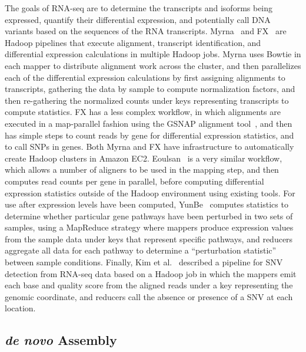 The goals of RNA-seq are to determine the transcripts and isoforms being expressed, quantify their differential expression, and potentially call DNA variants based on the sequences of the RNA transcripts.  Myrna~\cite{Langmead:2010p1268} and FX~\cite{Hong:2012du} are Hadoop pipelines that execute alignment, transcript identification, and differential expression calculations in multiple Hadoop jobs. Myrna uses Bowtie in each mapper to distribute alignment work across the cluster, and then parallelizes each of the differential expression calculations by first assigning alignments to transcripts, gathering the data by sample to compute normalization factors, and then re-gathering the normalized counts under keys representing transcripts to compute statistics. FX has a less complex workflow, in which alignments are executed in a map-parallel fashion using the GSNAP alignment tool~\cite{Wu:2010p875}, and then has simple steps to count reads by gene for differential expression statistics, and to call SNPs in genes. Both Myrna and FX have infrastructure to automatically create Hadoop clusters in Amazon EC2. Eoulsan~\cite{Jourdren:2012dc} is a very similar workflow, which allows a number of aligners to be used in the mapping step, and then computes read counts per gene in parallel, before computing differential expression statistics outside of the Hadoop environment using existing tools. For use after expression levels have been computed, YunBe~\cite{Zhang:2011p1823} computes statistics to determine whether particular gene pathways have been perturbed in two sets of samples, using a MapReduce strategy where mappers produce expression values from the sample data under keys that represent specific pathways, and reducers aggregate all data for each pathway to determine a ``perturbation statistic'' between sample conditions. Finally, Kim et al.~\cite{Kim2011RNASEQ} described a pipeline for SNV detection from RNA-seq data based on a Hadoop job in which the mappers emit each base and quality score from the aligned reads under a key representing the genomic coordinate, and reducers call the absence or presence of a SNV at each location.

\subsection{\emph{de novo} Assembly}


